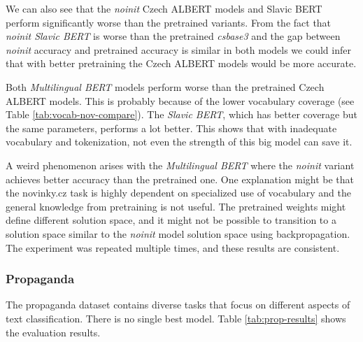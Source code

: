 \documentclass[
  printed, %
  color,   %
  table,   %
  oneside, %
  lof,     %
  lot,     %
]{fithesis3}
\begin{document}
We can also see that the \textit{noinit} Czech ALBERT models and Slavic BERT perform significantly worse than the pretrained variants. 
From the fact that \textit{noinit Slavic BERT} is worse than the pretrained \textit{csbase3} and the gap between \textit{noinit} accuracy and pretrained accuracy is similar in both models we could infer that with better pretraining the Czech ALBERT models would be more accurate.

Both \textit{Multilingual BERT} models perform worse than the pretrained Czech ALBERT models. This is probably because of the lower vocabulary coverage (see Table \ref{tab:vocab-nov-compare}). The \textit{Slavic BERT}, which has better coverage but the same parameters, performs a lot better. This shows that with inadequate vocabulary and tokenization, not even the strength of this big model can save it. 

A weird phenomenon arises with the \textit{Multilingual BERT} where the \textit{noinit} variant achieves better accuracy than the pretrained one. One explanation might be that the novinky.cz task is highly dependent on specialized use of vocabulary and the general knowledge from pretraining is not useful. The pretrained weights might define different solution space, and it might not be possible to transition to a solution space similar to the \textit{noinit} model solution space using backpropagation. The experiment was repeated multiple times, and these results are consistent. 


\subsubsection{Propaganda}

The propaganda dataset contains diverse tasks that focus on different aspects of text classification. There is no single best model. Table \ref{tab:prop-results} shows the evaluation results.
\end{document}
